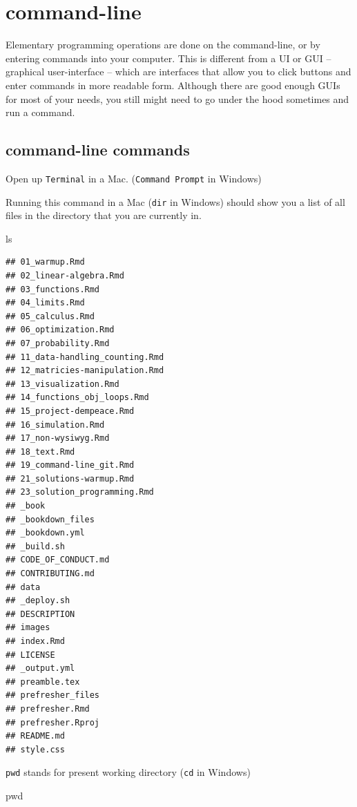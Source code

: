 \documentclass[]{book}
\newenvironment{Shaded}{\begin{snugshade}}{\end{snugshade}}
\newcommand{\FunctionTok}[1]{\textcolor[rgb]{0.00,0.00,0.00}{#1}}
\newcommand{\BuiltInTok}[1]{#1}
\theoremstyle{definition}
\theoremstyle{definition}
\theoremstyle{definition}
\theoremstyle{remark}
\begin{document}
\section{command-line}\label{command-line}

Elementary programming operations are done on the command-line, or by
entering commands into your computer. This is different from a UI or GUI
-- graphical user-interface -- which are interfaces that allow you to
click buttons and enter commands in more readable form. Although there
are good enough GUIs for most of your needs, you still might need to go
under the hood sometimes and run a command.

\subsection{command-line commands}\label{command-line-commands}

Open up \texttt{Terminal} in a Mac. (\texttt{Command\ Prompt} in
Windows)

Running this command in a Mac (\texttt{dir} in Windows) should show you
a list of all files in the directory that you are currently in.

\begin{Shaded}
\begin{Highlighting}[]
\FunctionTok{ls}
\end{Highlighting}
\end{Shaded}

\begin{verbatim}
## 01_warmup.Rmd
## 02_linear-algebra.Rmd
## 03_functions.Rmd
## 04_limits.Rmd
## 05_calculus.Rmd
## 06_optimization.Rmd
## 07_probability.Rmd
## 11_data-handling_counting.Rmd
## 12_matricies-manipulation.Rmd
## 13_visualization.Rmd
## 14_functions_obj_loops.Rmd
## 15_project-dempeace.Rmd
## 16_simulation.Rmd
## 17_non-wysiwyg.Rmd
## 18_text.Rmd
## 19_command-line_git.Rmd
## 21_solutions-warmup.Rmd
## 23_solution_programming.Rmd
## _book
## _bookdown_files
## _bookdown.yml
## _build.sh
## CODE_OF_CONDUCT.md
## CONTRIBUTING.md
## data
## _deploy.sh
## DESCRIPTION
## images
## index.Rmd
## LICENSE
## _output.yml
## preamble.tex
## prefresher_files
## prefresher.Rmd
## prefresher.Rproj
## README.md
## style.css
\end{verbatim}

\texttt{pwd} stands for present working directory (\texttt{cd} in
Windows)

\begin{Shaded}
\begin{Highlighting}[]
\BuiltInTok{pwd}
\end{Highlighting}
\end{Shaded}
\end{document}
